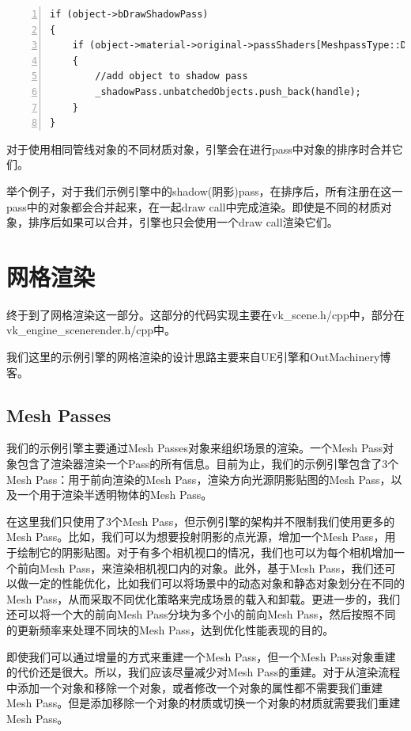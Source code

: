 \documentclass{ctexart}
\begin{document}
\begin{lstlisting}[language={[ANSI]C},keywordstyle=\color{blue!70},commentstyle=\color{red!50!green!50!blue!50},frame=shadowbox, rulesepcolor=\color{red!20!green!20!blue!20},basicstyle=\small,numbers=left, numberstyle=\tiny,breaklines=true]
if (object->bDrawShadowPass)
{
	if (object->material->original->passShaders[MeshpassType::DirectionalShadow])
	{
		//add object to shadow pass
		_shadowPass.unbatchedObjects.push_back(handle);
	}
}
\end{lstlisting}

对于使用相同管线对象的不同材质对象，引擎会在进行pass中对象的排序时合并它们。

举个例子，对于我们示例引擎中的shadow(阴影)pass，在排序后，所有注册在这一pass中的对象都会合并起来，在一起draw call中完成渲染。即使是不同的材质对象，排序后如果可以合并，引擎也只会使用一个draw call渲染它们。

\newpage
\section{网格渲染}

终于到了网格渲染这一部分。这部分的代码实现主要在vk\_scene.h/cpp中，部分在vk\_engine\_scenerender.h/cpp中。

我们这里的示例引擎的网格渲染的设计思路主要来自UE引擎和OutMachinery博客。

\subsection{Mesh Passes}

我们的示例引擎主要通过Mesh Passes对象来组织场景的渲染。一个Mesh Pass对象包含了渲染器渲染一个Pass的所有信息。目前为止，我们的示例引擎包含了3个Mesh Pass：用于前向渲染的Mesh Pass，渲染方向光源阴影贴图的Mesh Pass，以及一个用于渲染半透明物体的Mesh Pass。

在这里我们只使用了3个Mesh Pass，但示例引擎的架构并不限制我们使用更多的Mesh Pass。比如，我们可以为想要投射阴影的点光源，增加一个Mesh Pass，用于绘制它的阴影贴图。对于有多个相机视口的情况，我们也可以为每个相机增加一个前向Mesh Pass，来渲染相机视口内的对象。此外，基于Mesh Pass，我们还可以做一定的性能优化，比如我们可以将场景中的动态对象和静态对象划分在不同的Mesh Pass，从而采取不同优化策略来完成场景的载入和卸载。更进一步的，我们还可以将一个大的前向Mesh Pass分块为多个小的前向Mesh Pass，然后按照不同的更新频率来处理不同块的Mesh Pass，达到优化性能表现的目的。

即使我们可以通过增量的方式来重建一个Mesh Pass，但一个Mesh Pass对象重建的代价还是很大。所以，我们应该尽量减少对Mesh Pass的重建。对于从渲染流程中添加一个对象和移除一个对象，或者修改一个对象的属性都不需要我们重建Mesh Pass。但是添加移除一个对象的材质或切换一个对象的材质就需要我们重建Mesh Pass。
\end{document}

